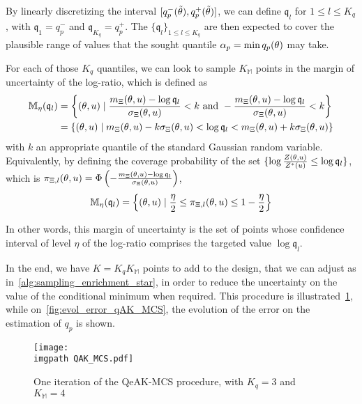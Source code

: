 \documentclass[../../Main_ManuscritThese.tex]{subfiles}
\newcommand\imgpath{/home/victor/acadwriting/Manuscrit/Text/Chapter4/img/}
\begin{document}
By linearly discretizing the interval
$\interval{q^-_p(\tilde{\kk})}{q^+_p(\tilde{\kk})}$, we can define
$\mathfrak{q}_l$ for $1 \leq l \leq K_q$, with
$\mathfrak{q}_1 = q^-_p$ and $\mathfrak{q}_{K_q} = q^+_p$. The
$\{\mathfrak{q}_l\}_{1\leq l \leq K_q}$ are then expected to cover the
plausible range of values that the sought quantile
$\alpha_p = \min q_p(\theta)$ may take.

For each of those $K_q$ quantiles, we can look to sample
$K_{\mathbb{M}}$ points in the margin of uncertainty of the log-ratio,
which is defined as
\begin{align}
  \mathbb{M}_{\eta}(\mathfrak{q}_l)  &= \left\{ (\theta, u) \mid \frac{m_{\Xi}(\theta, u) - \log \mathfrak{q}_l}{\sigma_{\Xi}(\theta, u)}< k \text{ and } -\frac{m_{\Xi}(\theta, u)-\log \mathfrak{q}_l}{\sigma_\Xi(\theta, u)}  <  k\right\} \\
                                     &= \{(\theta, u) \mid m_{\Xi}(\theta,u) - k\sigma_{\Xi}(\theta, u) < \log \mathfrak{q}_l < m_{\Xi}(\theta, u) + k\sigma_{\Xi}(\theta, u)\}
\end{align}
with $k$ an appropriate quantile of the standard Gaussian random
variable. Equivalently, by defining the coverage probability of the
set $\{\log \frac{Z(\theta,u)}{Z^*(u)}\leq \log \mathfrak{q}_l\}$,
which is
$\pi_{\Xi,l}(\theta, u) = \Phi\left(-\frac{m_{\Xi}(\theta, u) - \log
    \mathfrak{q}_l}{\sigma_{\Xi}(\theta, u)}\right)$,
\begin{equation}
  \mathbb{M}_{\eta}(\mathfrak{q}_l) = \left\{(\theta, u) \mid \frac{\eta}{2}\leq\pi_{\Xi,l}(\theta, u) \leq 1-\frac{\eta}{2}\right\}
\end{equation}

In other words, this margin of uncertainty is the set of points whose
confidence interval of level $\eta$ of the log-ratio comprises the
targeted value $\log \mathfrak{q}_l$.

In the end, we have $K = K_qK_{\mathbb{M}}$ points to add to the
design, that we can adjust as in~\cref{alg:sampling_enrichment_star},
in order to reduce the uncertainty on the value of the conditional
minimum when required. This procedure is
illustrated~\cref{fig:QAK_MCS}, while
on~\cref{fig:evol_error_qAK_MCS}, the evolution of the error on the 
estimation of $q_p$ is shown.
\begin{figure}[ht]
  \centering
  \texttt{[image: \\imgpath QAK\_MCS.pdf]}
  \caption{\label{fig:QAK_MCS} One iteration of the QeAK-MCS procedure, with $K_q=3$ and $K_{\mathbb{M}}=4$}
\end{figure}
\end{document}
